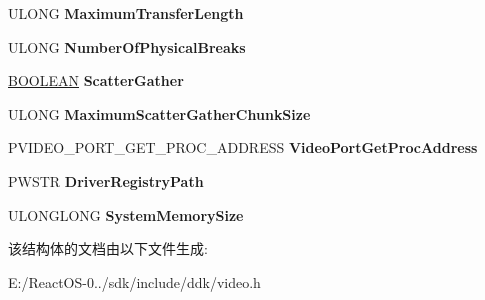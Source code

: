 \begin{DoxyCompactItemize}
\item 
\mbox{\label{struct___v_i_d_e_o___p_o_r_t___c_o_n_f_i_g___i_n_f_o_a03e310f49a5fb8ae7c2f04fd03b631cd}} 
U\+L\+O\+NG {\bfseries Maximum\+Transfer\+Length}
\item 
\mbox{\label{struct___v_i_d_e_o___p_o_r_t___c_o_n_f_i_g___i_n_f_o_ab47b672df6365aace123e92e095b6df3}} 
U\+L\+O\+NG {\bfseries Number\+Of\+Physical\+Breaks}
\item 
\mbox{\label{struct___v_i_d_e_o___p_o_r_t___c_o_n_f_i_g___i_n_f_o_a4f9c4b19c2cf8bc9e87f006436fb3da5}} 
\hyperlink{_processor_bind_8h_a112e3146cb38b6ee95e64d85842e380a}{B\+O\+O\+L\+E\+AN} {\bfseries Scatter\+Gather}
\item 
\mbox{\label{struct___v_i_d_e_o___p_o_r_t___c_o_n_f_i_g___i_n_f_o_aa9a1710d3ac2b1a837755a81a9fe93c4}} 
U\+L\+O\+NG {\bfseries Maximum\+Scatter\+Gather\+Chunk\+Size}
\item 
\mbox{\label{struct___v_i_d_e_o___p_o_r_t___c_o_n_f_i_g___i_n_f_o_a558871b40887f21b13748922773374a0}} 
P\+V\+I\+D\+E\+O\+\_\+\+P\+O\+R\+T\+\_\+\+G\+E\+T\+\_\+\+P\+R\+O\+C\+\_\+\+A\+D\+D\+R\+E\+SS {\bfseries Video\+Port\+Get\+Proc\+Address}
\item 
\mbox{\label{struct___v_i_d_e_o___p_o_r_t___c_o_n_f_i_g___i_n_f_o_ac10800078320bca563a1b13212762842}} 
P\+W\+S\+TR {\bfseries Driver\+Registry\+Path}
\item 
\mbox{\label{struct___v_i_d_e_o___p_o_r_t___c_o_n_f_i_g___i_n_f_o_a6ca9a2497e6732629c7af6dfd8d64564}} 
U\+L\+O\+N\+G\+L\+O\+NG {\bfseries System\+Memory\+Size}
\end{DoxyCompactItemize}


该结构体的文档由以下文件生成\+:\begin{DoxyCompactItemize}
\item 
E\+:/\+React\+O\+S-\/0../sdk/include/ddk/video.\+h\end{DoxyCompactItemize}
